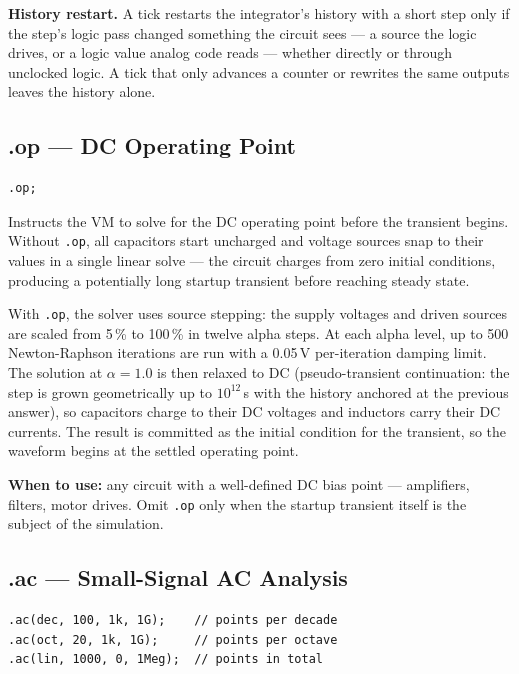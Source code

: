 \documentclass[11pt, a4paper]{article}
\newcommand{\code}[1]{\texttt{\small #1}}
\begin{document}
\textbf{History restart.} A tick restarts the integrator's history with a
short step only if the step's logic pass changed something the circuit sees
--- a source the logic drives, or a logic value analog code reads --- whether
directly or through unclocked logic. A tick that only advances a counter or
rewrites the same outputs leaves the history alone.

\subsection{.op — DC Operating Point}

\begin{lstlisting}
.op;
\end{lstlisting}

Instructs the VM to solve for the DC operating point before the transient
begins. Without \code{.op}, all capacitors start uncharged and voltage sources
snap to their values in a single linear solve — the circuit charges from zero
initial conditions, producing a potentially long startup transient before
reaching steady state.

With \code{.op}, the solver uses source stepping: the supply voltages and
driven sources are scaled from 5\,\% to 100\,\% in twelve alpha steps. At
each alpha level, up to 500 Newton-Raphson iterations are run with a
0.05\,V per-iteration damping limit. The solution at $\alpha = 1.0$ is
then relaxed to DC (pseudo-transient continuation: the step is grown
geometrically up to $10^{12}$\,s with the history anchored at the previous
answer), so capacitors charge to their DC voltages and inductors carry
their DC currents. The result is committed as the initial condition for
the transient, so the waveform begins at the settled operating point.

\textbf{When to use:} any circuit with a well-defined DC bias point —
amplifiers, filters, motor drives. Omit \code{.op} only when the startup
transient itself is the subject of the simulation.

\subsection{.ac --- Small-Signal AC Analysis}

\begin{lstlisting}
.ac(dec, 100, 1k, 1G);    // points per decade
.ac(oct, 20, 1k, 1G);     // points per octave
.ac(lin, 1000, 0, 1Meg);  // points in total
\end{lstlisting}
\end{document}
